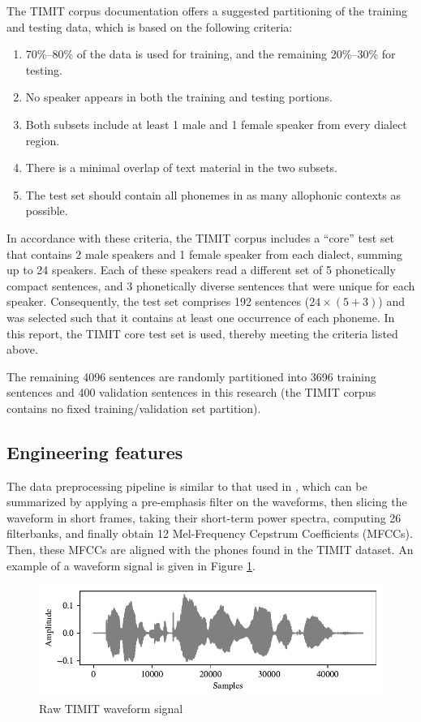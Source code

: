 		The TIMIT corpus documentation offers a suggested partitioning of the training and testing data, which is based on the following criteria:
		\begin{enumerate}
			\item 70\%--80\% of the data is used for training, and the remaining 20\%--30\% for testing.
			\item No speaker appears in both the training and testing portions.
			\item Both subsets include at least 1 male and 1 female speaker from every dialect region.
			\item There is a minimal overlap of text material in the two subsets.
			\item The test set should contain all phonemes in as many allophonic contexts as possible.
		\end{enumerate}
		In accordance with these criteria, the TIMIT corpus includes a ``core'' test set that contains 2 male speakers and 1 female speaker from each dialect, summing up to 24 speakers.
		Each of these speakers read a different set of 5 phonetically compact sentences, and 3 phonetically diverse sentences that were unique for each speaker.
		Consequently, the test set comprises 192 sentences ($24\times(5+3)$) and was selected such that it contains at least one occurrence of each phoneme.
		In this report, the TIMIT core test set is used, thereby meeting the criteria listed above.

		The remaining 4096 sentences are randomly partitioned into 3696 training sentences and 400 validation sentences in this research (the TIMIT corpus contains no fixed training/validation set partition).

	\subsection{Engineering features}

		The data preprocessing pipeline is similar to that used in \citet{fayek2016}, which can be summarized by applying a pre-emphasis filter on the waveforms, then slicing the waveform in short frames, taking their short-term power spectra, computing 26 filterbanks, and finally obtain 12 Mel-Frequency Cepstrum Coefficients (MFCCs).
		Then, these MFCCs are aligned with the phones found in the TIMIT dataset.
		An example of a waveform signal is given in Figure \ref{fig:signal}.
			\begin{figure}[ht]
				\centering
			    \includegraphics[width=\linewidth]{gfx/signal}
			    \caption{Raw TIMIT waveform signal}
			    \label{fig:signal}
			\end{figure}

